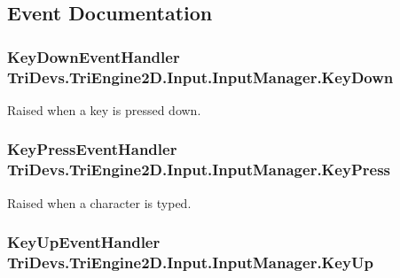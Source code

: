 \subsection{Event Documentation}
\hypertarget{class_tri_devs_1_1_tri_engine2_d_1_1_input_1_1_input_manager_af1ec1eb4d93418054f37bd17e6d6c476}{
\subsubsection[{Key\-Down}]{\setlength{\rightskip}{0pt plus 5cm}Key\-Down\-Event\-Handler Tri\-Devs.\-Tri\-Engine2\-D.\-Input.\-Input\-Manager.\-Key\-Down}}\label{class_tri_devs_1_1_tri_engine2_d_1_1_input_1_1_input_manager_af1ec1eb4d93418054f37bd17e6d6c476}


Raised when a key is pressed down. 

\hypertarget{class_tri_devs_1_1_tri_engine2_d_1_1_input_1_1_input_manager_ad246a86523ddd915bce9c113b363d915}{
\subsubsection[{Key\-Press}]{\setlength{\rightskip}{0pt plus 5cm}Key\-Press\-Event\-Handler Tri\-Devs.\-Tri\-Engine2\-D.\-Input.\-Input\-Manager.\-Key\-Press}}\label{class_tri_devs_1_1_tri_engine2_d_1_1_input_1_1_input_manager_ad246a86523ddd915bce9c113b363d915}


Raised when a character is typed. 

\hypertarget{class_tri_devs_1_1_tri_engine2_d_1_1_input_1_1_input_manager_a3435330d7f0dab7c9183122800c5a54e}{
\subsubsection[{Key\-Up}]{\setlength{\rightskip}{0pt plus 5cm}Key\-Up\-Event\-Handler Tri\-Devs.\-Tri\-Engine2\-D.\-Input.\-Input\-Manager.\-Key\-Up}}\label{class_tri_devs_1_1_tri_engine2_d_1_1_input_1_1_input_manager_a3435330d7f0dab7c9183122800c5a54e}


